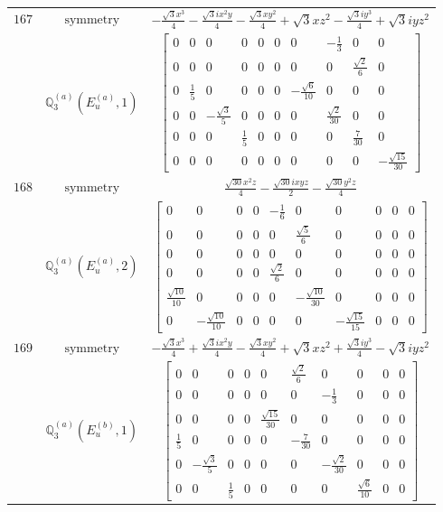 \documentclass[fleqn,8pt,landscape]{jsarticle}
\begin{document}
\begin{longtable}{ccc}
$ 167 $ & $ \text{symmetry} $ & $ - \frac{\sqrt{3} x^{3}}{4} - \frac{\sqrt{3} i x^{2} y}{4} - \frac{\sqrt{3} x y^{2}}{4} + \sqrt{3} x z^{2} - \frac{\sqrt{3} i y^{3}}{4} + \sqrt{3} i y z^{2} $ \\
$  $ & $ \mathbb{Q}_{3}^{(a)}(E_{u}^{(a)},1) $ & $ \begin{bmatrix} 0 & 0 & 0 & 0 & 0 & 0 & 0 & - \frac{1}{3} & 0 & 0 \\ 0 & 0 & 0 & 0 & 0 & 0 & 0 & 0 & \frac{\sqrt{2}}{6} & 0 \\ 0 & \frac{1}{5} & 0 & 0 & 0 & 0 & - \frac{\sqrt{6}}{10} & 0 & 0 & 0 \\ 0 & 0 & - \frac{\sqrt{3}}{5} & 0 & 0 & 0 & 0 & \frac{\sqrt{2}}{30} & 0 & 0 \\ 0 & 0 & 0 & \frac{1}{5} & 0 & 0 & 0 & 0 & \frac{7}{30} & 0 \\ 0 & 0 & 0 & 0 & 0 & 0 & 0 & 0 & 0 & - \frac{\sqrt{15}}{30} \end{bmatrix} $ \\ \hline
$ 168 $ & $ \text{symmetry} $ & $ \frac{\sqrt{30} x^{2} z}{4} - \frac{\sqrt{30} i x y z}{2} - \frac{\sqrt{30} y^{2} z}{4} $ \\
$  $ & $ \mathbb{Q}_{3}^{(a)}(E_{u}^{(a)},2) $ & $ \begin{bmatrix} 0 & 0 & 0 & 0 & - \frac{1}{6} & 0 & 0 & 0 & 0 & 0 \\ 0 & 0 & 0 & 0 & 0 & \frac{\sqrt{5}}{6} & 0 & 0 & 0 & 0 \\ 0 & 0 & 0 & 0 & 0 & 0 & 0 & 0 & 0 & 0 \\ 0 & 0 & 0 & 0 & \frac{\sqrt{2}}{6} & 0 & 0 & 0 & 0 & 0 \\ \frac{\sqrt{10}}{10} & 0 & 0 & 0 & 0 & - \frac{\sqrt{10}}{30} & 0 & 0 & 0 & 0 \\ 0 & - \frac{\sqrt{10}}{10} & 0 & 0 & 0 & 0 & - \frac{\sqrt{15}}{15} & 0 & 0 & 0 \end{bmatrix} $ \\ \hline
$ 169 $ & $ \text{symmetry} $ & $ - \frac{\sqrt{3} x^{3}}{4} + \frac{\sqrt{3} i x^{2} y}{4} - \frac{\sqrt{3} x y^{2}}{4} + \sqrt{3} x z^{2} + \frac{\sqrt{3} i y^{3}}{4} - \sqrt{3} i y z^{2} $ \\
$  $ & $ \mathbb{Q}_{3}^{(a)}(E_{u}^{(b)},1) $ & $ \begin{bmatrix} 0 & 0 & 0 & 0 & 0 & \frac{\sqrt{2}}{6} & 0 & 0 & 0 & 0 \\ 0 & 0 & 0 & 0 & 0 & 0 & - \frac{1}{3} & 0 & 0 & 0 \\ 0 & 0 & 0 & 0 & \frac{\sqrt{15}}{30} & 0 & 0 & 0 & 0 & 0 \\ \frac{1}{5} & 0 & 0 & 0 & 0 & - \frac{7}{30} & 0 & 0 & 0 & 0 \\ 0 & - \frac{\sqrt{3}}{5} & 0 & 0 & 0 & 0 & - \frac{\sqrt{2}}{30} & 0 & 0 & 0 \\ 0 & 0 & \frac{1}{5} & 0 & 0 & 0 & 0 & \frac{\sqrt{6}}{10} & 0 & 0 \end{bmatrix} $ \\ \hline

\end{longtable}
\end{document}
